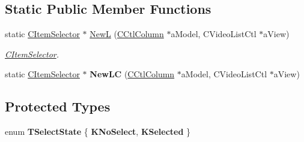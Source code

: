 \subsection*{Static Public Member Functions}
\begin{DoxyCompactItemize}
\item 
\mbox{\label{classCItemSelector_a145c265e67ff384e294bb53e662679da}} 
static \hyperlink{classCItemSelector}{C\+Item\+Selector} $\ast$ \hyperlink{classCItemSelector_a145c265e67ff384e294bb53e662679da}{NewL} (\hyperlink{classCCtlColumn}{C\+Ctl\+Column} $\ast$a\+Model, C\+Video\+List\+Ctl $\ast$a\+View)
\begin{DoxyCompactList}\small\item\em \hyperlink{classCItemSelector}{C\+Item\+Selector}. \end{DoxyCompactList}\item 
\mbox{\label{classCItemSelector_aa49db6f3acad03c14605774e4cb230ec}} 
static \hyperlink{classCItemSelector}{C\+Item\+Selector} $\ast$ {\bfseries New\+LC} (\hyperlink{classCCtlColumn}{C\+Ctl\+Column} $\ast$a\+Model, C\+Video\+List\+Ctl $\ast$a\+View)
\end{DoxyCompactItemize}
\subsection*{Protected Types}
\begin{DoxyCompactItemize}
\item 
\mbox{\label{classCItemSelector_a32525d4067d32c4e31c1997ae32f0011}} 
enum {\bfseries T\+Select\+State} \{ {\bfseries K\+No\+Select}, 
{\bfseries K\+Selected}
 \}
\end{DoxyCompactItemize}
